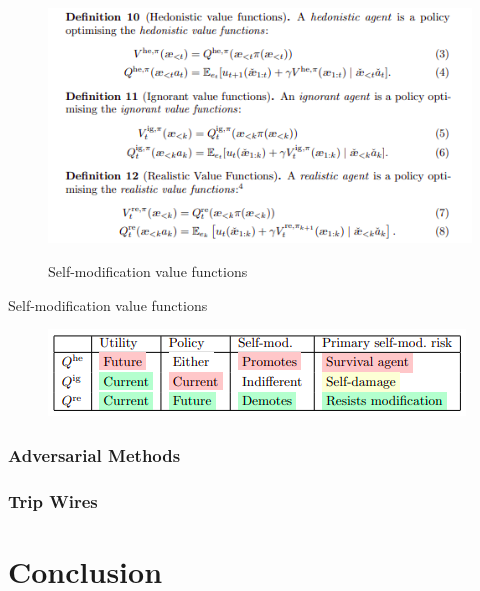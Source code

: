 \documentclass[a4paper,12pt]{report}
\begin{document}
\begin{figure}[H]
    \centering
    \caption{Self-modification value functions \cite{EverittFDH16}}
    \includegraphics[scale=0.8]{lookahead_definitions.png}
    \label{fig:value_func}
\end{figure}

\begin{table}[h]
    \bigskip
    \caption{Self-modification value functions \cite{EverittFDH16}}
    \begin{figure}[H]
        \centering
        \includegraphics[scale=0.8]{lookahead_table.png}
    \end{figure}
    \label{table:val_func_table}
\end{table}

\subsection{Adversarial Methods}

\subsection{Trip Wires}

\chapter{Conclusion}

\renewcommand{\bibname}{References}


\end{document}

